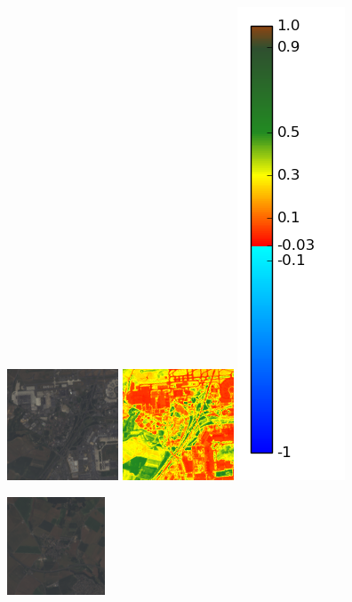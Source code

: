 \documentclass{book}
\begin{document}
\begin{figure}[H]
\centerline{
\includegraphics[scale=1.1]{../3_ndvi/images/Roissy-en-France/07_rgb.png}
\includegraphics[scale=1.1]{../3_ndvi/images/Roissy-en-France/07_ndvi.png}
\includegraphics[scale=0.3]{../3_ndvi/images/colormap.png}
}
\centerline{
\includegraphics[scale=1.1]{../3_ndvi/images/Fontenay-en-Parisis/07_rgb.png}
}
\end{figure}
\end{document}
